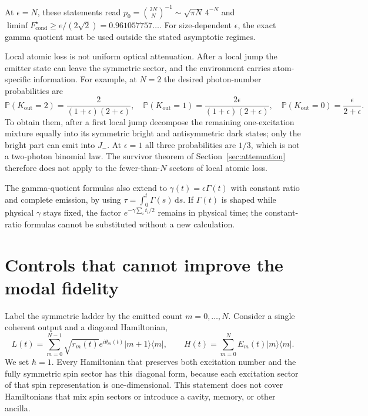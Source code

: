 \documentclass[11pt,a4paper]{article}
\newcommand{\Prob}{\mathbb P}
\newcommand{\dd}{\,\mathrm d}
\begin{document}
At \(\epsilon=N\), these statements read
\(p_0=\binom{2N}{N}^{-1}\sim\sqrt{\pi N}\,4^{-N}\) and
\(\liminf F_{\mathrm{cond}}^\star\ge e/(2\sqrt2)
=0.961057757\ldots\).
For size-dependent \(\epsilon\), the exact gamma quotient must be
used outside the stated asymptotic regimes.

Local atomic loss is not uniform optical attenuation. After a local
jump the emitter state can leave the symmetric sector, and the
environment carries atom-specific information. For example, at
\(N=2\) the desired photon-number probabilities are
\begin{equation}
 \Prob(K_{\mathrm{out}}=2)=\frac2{(1+\epsilon)(2+\epsilon)},\quad
 \Prob(K_{\mathrm{out}}=1)=\frac{2\epsilon}{(1+\epsilon)(2+\epsilon)},
 \quad
 \Prob(K_{\mathrm{out}}=0)=\frac{\epsilon}{2+\epsilon}.
\end{equation}
To obtain them, after a first local jump decompose the remaining
one-excitation mixture equally into its symmetric bright and
antisymmetric dark states; only the bright part can emit into
\(J_-\). At \(\epsilon=1\) all three probabilities are \(1/3\),
which is not a two-photon binomial law. The survivor theorem of
Section~\ref{sec:attenuation} therefore does not apply to the
fewer-than-\(N\) sectors of local atomic loss.

The gamma-quotient formulas also extend to
\(\gamma(t)=\epsilon\Gamma(t)\) with constant ratio and complete
emission, by using \(\tau=\int_0^t\Gamma(s)\dd s\). If
\(\Gamma(t)\) is shaped while physical \(\gamma\) stays fixed,
the factor \(e^{-\gamma\sum_i t_i/2}\) remains in physical time;
the constant-ratio formulas cannot be substituted without a new
calculation.

\section{Controls that cannot improve the modal fidelity}
\label{sec:phases}

Label the symmetric ladder by the emitted count \(m=0,\ldots,N\).
Consider a single coherent output and a diagonal Hamiltonian,
\begin{equation}
 L(t)=\sum_{m=0}^{N-1}\sqrt{r_m(t)}e^{i\theta_m(t)}
 |m+1\rangle\langle m|,\qquad
 H(t)=\sum_{m=0}^{N}E_m(t)|m\rangle\langle m|.
 \label{eq:ladder}
\end{equation}
We set \(\hbar=1\). Every Hamiltonian that preserves both excitation
number and the fully symmetric spin sector has this diagonal
form, because each excitation sector of that spin representation
is one-dimensional. This statement does not cover Hamiltonians
that mix spin sectors or introduce a cavity, memory, or other
ancilla.
\end{document}
